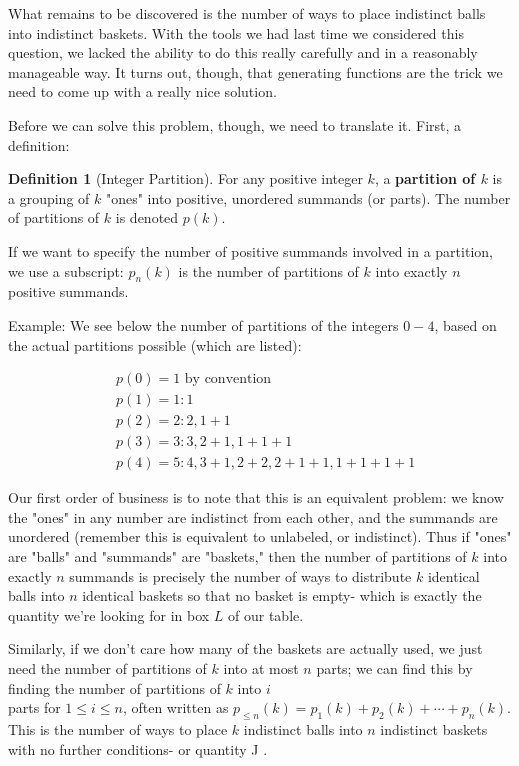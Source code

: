 \documentclass{article}
\theoremstyle{definition}
\newtheorem{definition}{Definition}
\begin{document}
What remains to be discovered is the number of ways to place indistinct balls into indistinct baskets. With the tools we had last time we considered this question, we lacked the ability to do this really carefully and in a reasonably manageable way. It turns out, though, that generating functions are the trick we need to come up with a really nice solution.

Before we can solve this problem, though, we need to translate it. First, a definition:

\begin{definition}[Integer Partition]
For any positive integer $k$, a \textbf{partition of $k$} is a grouping of $k$ "ones" into positive, unordered summands (or parts). The number of partitions of $k$ is denoted $p(k)$.
\end{definition}

If we want to specify the number of positive summands involved in a partition, we use a subscript: $p_{n}(k)$ is the number of partitions of $k$ into exactly $n$ positive summands.

Example: We see below the number of partitions of the integers $0-4$, based on the actual partitions possible (which are listed):

$$
\begin{aligned}
& p(0)=1 \text { by convention } \\
& p(1)=1: 1 \\
& p(2)=2: 2,1+1 \\
& p(3)=3: 3,2+1,1+1+1 \\
& p(4)=5: 4,3+1,2+2,2+1+1,1+1+1+1
\end{aligned}
$$

Our first order of business is to note that this is an equivalent problem: we know the "ones" in any number are indistinct from each other, and the summands are unordered (remember this is equivalent to unlabeled, or indistinct). Thus if "ones" are "balls" and "summands" are "baskets," then the number of partitions of $k$ into exactly $n$ summands is precisely the number of ways to distribute $k$ identical balls into $n$ identical baskets so that no basket is empty- which is exactly the quantity we're looking for in box $L$ of our table.

Similarly, if we don't care how many of the baskets are actually used, we just need the number of partitions of $k$ into at most $n$ parts; we can find this by finding the number of partitions of $k$ into $i$\\
parts for $1 \leq i \leq n$, often written as $p_{\leq n}(k)=p_{1}(k)+p_{2}(k)+\cdots+p_{n}(k)$. This is the number of ways to place $k$ indistinct balls into $n$ indistinct baskets with no further conditions- or quantity J .
\end{document}
